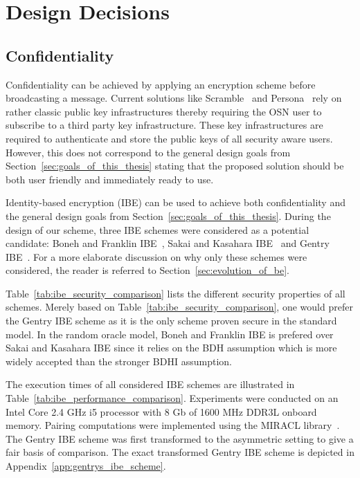 \section{Design Decisions}
\subsection{Confidentiality}
Confidentiality can be achieved by applying an encryption scheme before broadcasting a message. Current solutions like Scramble~\cite{art:BeatoKW11} and Persona~\cite{art:BadenBSBS09} rely on rather classic public key infrastructures thereby requiring the OSN user to subscribe to a third party key infrastructure. These key infrastructures are required to authenticate and store the public keys of all security aware users. However, this does not correspond to the general design goals from Section~\ref{sec:goals_of_this_thesis} stating that the proposed solution should be both user friendly and immediately ready to use.

Identity-based encryption (IBE) can be used to achieve both confidentiality and the general design goals from Section~\ref{sec:goals_of_this_thesis}. During the design of our scheme, three IBE schemes were considered as a potential candidate: Boneh and Franklin IBE~\cite{art:BonehF01}, Sakai and Kasahara IBE~\cite{art:SakaiK03} and Gentry IBE~\cite{art:Gentry06}. For a more elaborate discussion on why only these schemes were considered, the reader is referred to Section~\ref{sec:evolution_of_be}.

Table~\ref{tab:ibe_security_comparison} lists the different security properties of all schemes. Merely based on Table~\ref{tab:ibe_security_comparison}, one would prefer the Gentry IBE scheme as it is the only scheme proven secure in the standard model. In the random oracle model, Boneh and Franklin IBE is prefered over Sakai and Kasahara IBE since it relies on the BDH assumption which is more widely accepted than the stronger BDHI assumption.

The execution times of all considered IBE schemes are illustrated in Table~\ref{tab:ibe_performance_comparison}. Experiments were conducted on an Intel Core 2.4 GHz i5 processor with 8 Gb of 1600 MHz DDR3L onboard memory. Pairing computations were implemented using the MIRACL library~\cite{art:Scott03}. The Gentry IBE scheme was first transformed to the asymmetric setting to give a fair basis of comparison. The exact transformed Gentry IBE scheme is depicted in Appendix~\ref{app:gentrys_ibe_scheme}. 

